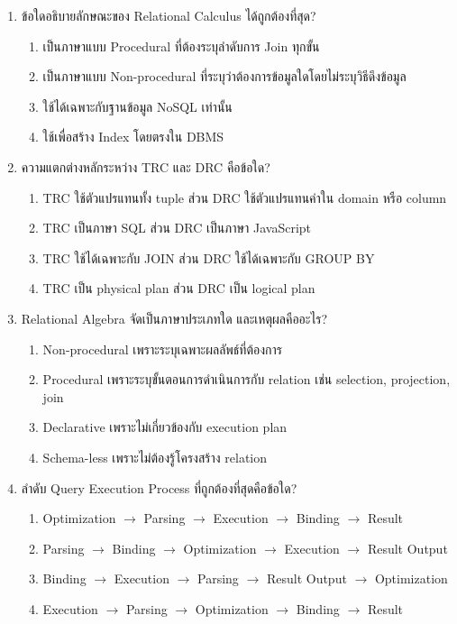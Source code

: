 \documentclass[a4paper,12pt]{article}
\begin{document}
\begin{enumerate}[label=\textbf{\arabic*.}]
    \item ข้อใดอธิบายลักษณะของ Relational Calculus ได้ถูกต้องที่สุด?
    \begin{enumerate}[label=\alph*.]
        \item เป็นภาษาแบบ Procedural ที่ต้องระบุลำดับการ Join ทุกขั้น
        \item เป็นภาษาแบบ Non-procedural ที่ระบุว่าต้องการข้อมูลใดโดยไม่ระบุวิธีดึงข้อมูล
        \item ใช้ได้เฉพาะกับฐานข้อมูล NoSQL เท่านั้น
        \item ใช้เพื่อสร้าง Index โดยตรงใน DBMS
    \end{enumerate}

    \item ความแตกต่างหลักระหว่าง TRC และ DRC คือข้อใด?
    \begin{enumerate}[label=\alph*.]
        \item TRC ใช้ตัวแปรแทนทั้ง tuple ส่วน DRC ใช้ตัวแปรแทนค่าใน domain หรือ column
        \item TRC เป็นภาษา SQL ส่วน DRC เป็นภาษา JavaScript
        \item TRC ใช้ได้เฉพาะกับ JOIN ส่วน DRC ใช้ได้เฉพาะกับ GROUP BY
        \item TRC เป็น physical plan ส่วน DRC เป็น logical plan
    \end{enumerate}

    \item Relational Algebra จัดเป็นภาษาประเภทใด และเหตุผลคืออะไร?
    \begin{enumerate}[label=\alph*.]
        \item Non-procedural เพราะระบุเฉพาะผลลัพธ์ที่ต้องการ
        \item Procedural เพราะระบุขั้นตอนการดำเนินการกับ relation เช่น selection, projection, join
        \item Declarative เพราะไม่เกี่ยวข้องกับ execution plan
        \item Schema-less เพราะไม่ต้องรู้โครงสร้าง relation
    \end{enumerate}

    \item ลำดับ Query Execution Process ที่ถูกต้องที่สุดคือข้อใด?
    \begin{enumerate}[label=\alph*.]
        \item Optimization $\rightarrow$ Parsing $\rightarrow$ Execution $\rightarrow$ Binding $\rightarrow$ Result
        \item Parsing $\rightarrow$ Binding $\rightarrow$ Optimization $\rightarrow$ Execution $\rightarrow$ Result Output
        \item Binding $\rightarrow$ Execution $\rightarrow$ Parsing $\rightarrow$ Result Output $\rightarrow$ Optimization
        \item Execution $\rightarrow$ Parsing $\rightarrow$ Optimization $\rightarrow$ Binding $\rightarrow$ Result
    \end{enumerate}


\end{enumerate}
\end{document}
